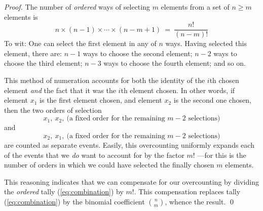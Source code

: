 \begin{proof}
The number of {\em ordered} ways of selecting $m$ elements from a set of $n \geq m$ elements is 
\begin{equation}
\label{eq:combination}
n \times (n-1) \times \cdots \times (n-m+1) \ = \ \frac{n!}{(n-m)!}
\end{equation}
To wit: One can select the first element in any of $n$ ways.  Having selected this element, there are: $n-1$ ways to choose the second element; $n-2$ ways to choose the third element; $n-3$ ways to choose the fourth element; and so on.

\smallskip

This method of numeration accounts for both the identity of the $i$th chosen element  {\em and} the fact that it was the $i$th element chosen.  In other words, if element $x_1$ is the first element chosen, and element $x_2$ is the second one chosen, then the two orders of selection
\[ x_1, \ x_2, \ \mbox{(a fixed order for the remaining $m-2$ selections)} \]
and 
\[ x_2, \ x_1, \ \mbox{(a fixed order for the remaining $m-2$ selections)} \]
are counted as separate events.  Easily, this overcounting uniformly expands each of the events that we {\em do} want to account for by the factor $m!$ ---for this is the number of orders  in which we could have selected the finally chosen $m$ elements.

\smallskip

This reasoning indicates that we can compensate for our overcounting by dividing the {\em ordered} tally (\ref{eq:combination}) by $m!$.  This compensation replaces tally (\ref{eq:combination}) by the binomial coefficient $\displaystyle {n \choose m}$, whence the result.  \qed
\end{proof}

\bigskip

\noindent {}

